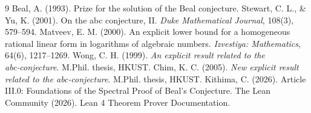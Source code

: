 \documentclass[11pt,a4paper]{article}
\begin{document}

\begin{thebibliography}{9}
  Beal, A. (1993). Prize for the solution of the Beal conjecture.
  Stewart, C. L., \& Yu, K. (2001). On the abc conjecture, II. \emph{Duke Mathematical Journal}, 108(3), 579–594.
  Matveev, E. M. (2000). An explicit lower bound for a homogeneous rational linear form in logarithms of algebraic numbers. \emph{Izvestiya: Mathematics}, 64(6), 1217–1269.
  Wong, C. H. (1999). \emph{An explicit result related to the abc‑conjecture}. M.Phil. thesis, HKUST.
  Chim, K. C. (2005). \emph{New explicit result related to the abc‑conjecture}. M.Phil. thesis, HKUST.
  Kithima, C. (2026). Article III.0: Foundations of the Spectral Proof of Beal's Conjecture.
  The Lean Community (2026). Lean 4 Theorem Prover Documentation.
\end{thebibliography}
\end{document}
